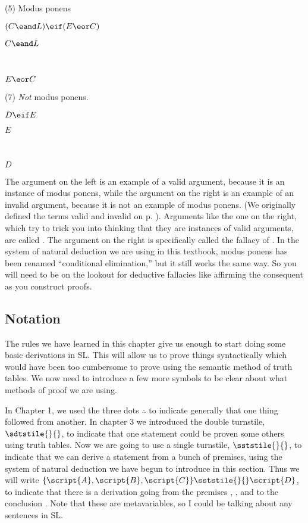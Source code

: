 \begin{multicols}{2}
(5) Modus ponens
	\begin{earg}
	\item[1.] $(C \eand L) \eif (E \eor C)$
	\item[2.] $C \eand L$
	\item[] \textcolor{white}{.}\sout{\hspace{.5\linewidth}} \textcolor{white}{.} 
	\item[$\therefore$] $E \eor C$
	\end{earg}
(7) \emph{Not} modus ponens.
	\begin{earg} 
	\item[1.] $D \eif E$
	\item[2.] $E$
\item[] \textcolor{white}{.}\sout{\hspace{.2\linewidth}} \textcolor{white}{.} 
	\item[$\therefore$] $D$
	\end{earg}
\end{multicols}
The argument on the left is an example of a valid argument, because it is an instance of modus ponens, while the argument on the right is an example of an invalid argument, because it is not an example of modus ponens. (We originally defined the terms valid and invalid on p. \pageref{def:valid}). Arguments like the one on the right, which try to trick you into thinking that they are instances of valid arguments, are called . The argument on the right is specifically called the fallacy of . In the system of natural deduction we are using in this textbook, modus ponens has been renamed ``conditional elimination,'' but it still works the same way. So you will need to be on the lookout for deductive fallacies like affirming the consequent as you construct proofs. 

\subsection{Notation}

The rules we have learned in this chapter give us enough to start doing some basic derivations in SL. This will allow us to prove things syntactically which would have been too cumbersome to prove using the semantic method of truth tables. We now need to introduce a few more symbols to be clear about what methods of proof we are using. 

In Chapter 1, we used the three dots $\therefore$ to indicate generally that one thing followed from another. In chapter 3 we introduced the double turnstile, $\sdtstile{}{}$, to indicate that one statement could be proven some others using truth tables. Now we are going to use a single turnstile, $\sststile{}{}$, to indicate that we can derive a statement from a bunch of premises, using the system of natural deduction we have begun to introduce in this section. Thus we will write $\{\script{A}, \script{B}, \script{C}\} \sststile{}{} \script{D}$, to indicate that there is a derivation going from the premises , , and  to the conclusion . Note that these are metavariables, so I could be talking about any sentences in SL.

